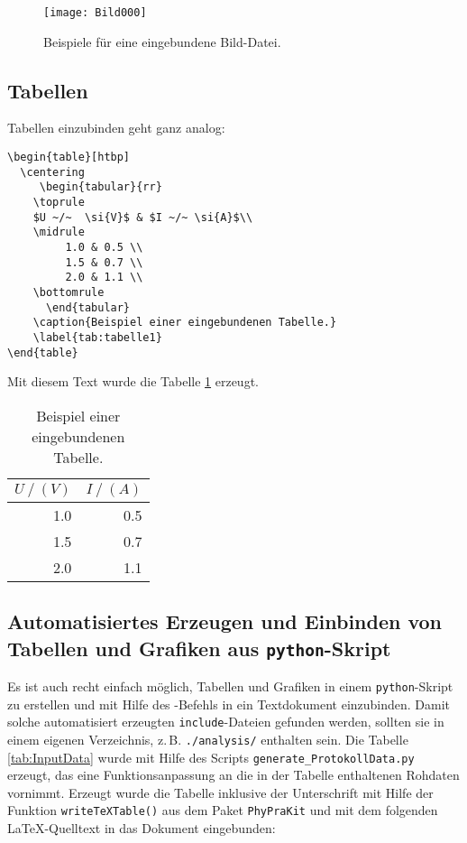\documentclass[a4paper,10pt]{article}
\begin{document}
\begin{figure}[htbp]
  \centering
    \texttt{[image: Bild000]}
    \caption{Beispiele für eine eingebundene Bild-Datei.}
    \label{fig:bild1}
\end{figure}

\subsection{Tabellen}
Tabellen einzubinden geht ganz analog: 
\begin{verbatim} 
\begin{table}[htbp]
  \centering
     \begin{tabular}{rr}
	\toprule
	$U ~/~  \si{V}$ & $I ~/~ \si{A}$\\
	\midrule
         1.0 & 0.5 \\
         1.5 & 0.7 \\
         2.0 & 1.1 \\
	\bottomrule
      \end{tabular}
    \caption{Beispiel einer eingebundenen Tabelle.}
    \label{tab:tabelle1}
\end{table}
\end{verbatim}

Mit diesem Text wurde die Tabelle \ref{tab:tabelle1} erzeugt.  
\begin{table}[htbp]
  \centering
     \begin{tabular}{rr}
	\toprule
	$U ~/~ (V)$ & $I ~/~ (A)$\\
	\midrule
         1.0 & 0.5 \\
         1.5 & 0.7 \\
         2.0 & 1.1 \\
	\bottomrule
      \end{tabular}
    \caption{Beispiel einer eingebundenen Tabelle.}
    \label{tab:tabelle1}
\end{table}

\newpage

\subsection{Automatisiertes Erzeugen und Einbinden von Tabellen und Grafiken aus \texttt{python}-Skript}

Es ist auch recht einfach möglich, Tabellen und Grafiken
in einem \verb|python|-Skript zu erstellen und mit Hilfe des
\verb||-Befehls in ein Textdokument einzubinden.
Damit solche automatisiert erzeugten \texttt{include}-Dateien
gefunden werden, sollten sie in einem eigenen Verzeichnis,
z.\,B. \texttt{./analysis/} enthalten sein.
Die Tabelle\,\ref{tab:InputData} wurde mit Hilfe des Scripts
\verb|generate_ProtokollData.py| erzeugt, das eine Funktionsanpassung
an die in der Tabelle enthaltenen Rohdaten vornimmt. 
Erzeugt wurde die Tabelle inklusive der Unterschrift mit Hilfe der
Funktion \verb|writeTeXTable()| aus dem Paket \verb|PhyPraKit|
und mit dem folgenden \LaTeX-Quelltext in das Dokument eingebunden:
\end{document}
